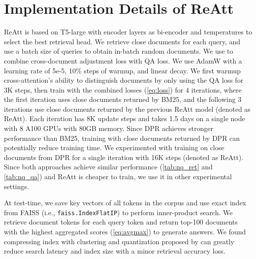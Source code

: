 \documentclass[11pt, dvipsnames]{article}
\newcommand{\ours}{ReAtt\xspace}
\newcommand{\adjustloss}{cross-document adjustment loss\xspace}
\begin{document}
\section{Implementation Details of \ours}\label{sec:impl_details}
\ours is based on T5-large with  encoder layers as bi-encoder and temperatures  to select the best retrieval head.
We retrieve  close documents for each query, and use a batch size of  queries to obtain in-batch random documents.
We use  to combine \adjustloss with QA loss.
We use AdamW with a learning rate of 5e-5, 10\% steps of warmup, and linear decay.
We first warmup cross-attention's ability to distinguish documents by only using the QA loss for 3K steps, then train with the combined losses (\autoref{eq:loss}) for 4 iterations, where the first iteration uses close documents returned by BM25, and the following 3 iterations use close documents returned by the previous \ours model (denoted as \ours).
Each iteration has 8K update steps and takes  1.5 days on a single node with 8  A100 GPUs with 80GB memory.
Since DPR \cite{dpr-2020-karpukhin} achieves stronger performance than BM25, training with close documents returned by DPR can potentially reduce training time.
We experimented with training on close documents from DPR for a single iteration with 16K steps (denoted as \ours).
Since both approaches achieve similar performance (\autoref{tab:nq_ret} and \autoref{tab:nq_qa}) and \ours is cheaper to train, we use it in other experimental settings.

At test-time, we save key vectors of all tokens in the corpus and use exact index from FAISS (i.e., \texttt{faiss.IndexFlatIP}) to perform inner-product search.
We retrieve  document tokens for each query token and return top-100 documents with the highest aggregated scores (\autoref{eq:avgmax}) to generate answers.
We found compressing index with clustering and quantization proposed by \citet{colbertv2-2021-santhanam} can greatly reduce search latency and index size with a minor retrieval accuracy loss.
\end{document}
